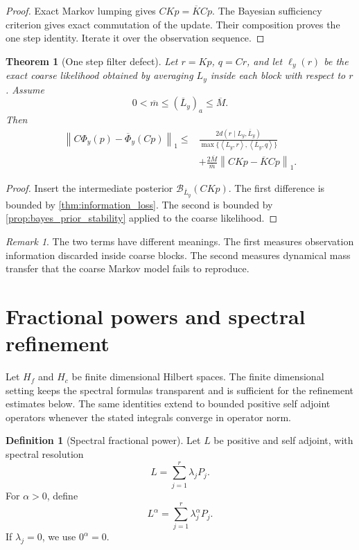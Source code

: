 \documentclass{aomart}
\newtheorem{theorem}{Theorem}[section]
\theoremstyle{definition}
\newtheorem{definition}[definition]{Definition}
\theoremstyle{remark}
\newtheorem{remark}[remark]{Remark}
\newcommand{\Bcal}{\mathcal B}
\newcommand{\norm}[1]{\left\lVert#1\right\rVert}
\newcommand{\ip}[2]{\left\langle#1,#2\right\rangle}
\begin{document}
\begin{proof}
Exact Markov lumping gives \(CKp=\overline KCp\). The Bayesian sufficiency criterion gives exact commutation of the update. Their composition proves the one step identity. Iterate it over the observation sequence.
\end{proof}

\begin{theorem}[One step filter defect]\label{thm:filter_defect}
Let \(r=Kp\), \(q=Cr\), and let \(\ell_y(r)\) be the exact coarse likelihood obtained by averaging \(L_y\) inside each block with respect to \(r\). Assume
\[
0<\overline m\leq(\overline L_y)_a\leq\overline M.
\]
Then
\[
\begin{aligned}
\norm{C\Phi_y(p)-\overline\Phi_y(Cp)}_1
\leq{}&
\frac{2d(r\mid L_y,\overline L_y)}
{\max\{\ip{L_y}{r},\ip{\overline L_y}{q}\}}\\
&+
\frac{2\overline M}{\overline m}
\norm{CKp-\overline KCp}_1.
\end{aligned}
\]
\end{theorem}

\begin{proof}
Insert the intermediate posterior \(\Bcal_{\overline L_y}(CKp)\). The first difference is bounded by \cref{thm:information_loss}. The second is bounded by \cref{prop:bayes_prior_stability} applied to the coarse likelihood.
\end{proof}

\begin{remark}
The two terms have different meanings. The first measures observation information discarded inside coarse blocks. The second measures dynamical mass transfer that the coarse Markov model fails to reproduce.
\end{remark}

\section{Fractional powers and spectral refinement}\label{sec:fractional}

Let \(H_f\) and \(H_c\) be finite dimensional Hilbert spaces. The finite dimensional setting keeps the spectral formulas transparent and is sufficient for the refinement estimates below. The same identities extend to bounded positive self adjoint operators whenever the stated integrals converge in operator norm.

\begin{definition}[Spectral fractional power]\label{def:spectral_fractional_power}
Let \(L\) be positive and self adjoint, with spectral resolution
\[
L=\sum_{j=1}^{r}\lambda_jP_j.
\]
For \(\alpha>0\), define
\[
L^\alpha=\sum_{j=1}^{r}\lambda_j^\alpha P_j.
\]
If \(\lambda_j=0\), we use \(0^\alpha=0\).
\end{definition}
\end{document}
